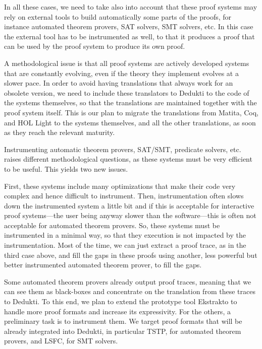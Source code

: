 In all these cases, we need to take also into account that these proof
systems may rely on external tools to build automatically some parts
of the proofs, for instance automated theorem provers, SAT solvers,
SMT solvers, etc. In this case the external tool has to be
instrumented as well, to that it produces a proof that can be used by
the proof system to produce its own proof.

A methodological issue is that all proof systems are actively
developed systems that are constantly evolving, even if the theory
they implement evolves at a slower pace. In order to avoid having
translations that always work for an obsolete version, we need to
include these translators to Dedukti to the code of the systems
themselves, so that the translations are maintained together with
the proof system itself. This is our plan to migrate the
translations from Matita, Coq, and HOL Light to the systems
themselves, and all the other translations, as soon as they reach the
relevant maturity.


Instrumenting automatic theorem provers, SAT/SMT, predicate solvers,
etc.
raises different methodological questions, as these systems
must be very efficient to be useful. This yields two new issues.

First, these systems include many optimizations that make their code
very complex and hence difficult to instrument. Then, instrumentation
often slows down the instrumented system a little bit and if this is
acceptable for interactive proof systems---the user being anyway
slower than the software---this is often not acceptable for automated
theorem provers.
So, these systems must be instrumented in a minimal way, so that they
execution is not impacted by the instrumentation.  Most of the
time, we can just extract a proof trace, as in the third case above,
and fill the gaps in these proofs using another, less powerful but better
instrumented automated theorem prover, to fill the gaps.

Some automated theorem provers already output proof traces, meaning
that we can see them as black-boxes and concentrate on the translation
from these traces to Dedukti. To this end, we plan to extend the
prototype tool Ekstrakto to handle more proof formats and increase its
expressivity.
For the others, a preliminary task is to instrument them.  We target
proof formats that will be already integrated into Dedukti, in
particular TSTP, for automated theorem provers, and LSFC, for SMT solvers.


